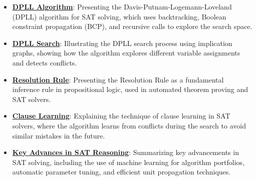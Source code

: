 \documentclass{article}%
\begin{document}
\begin{itemize}[leftmargin=*]
\item \href{https://purdue.brightspace.com/d2l/common/assets/pdfjs-d2l-dist/1.0.14-legacy/web/viewer.html?file=\%2Fcontent\%2Fenforced\%2F1095467-wl.202510.CS.24300.001\%2F15L2-SAT.pdf\%3Fou\%3D1095467\&lang=en-us\&container=d2l-fileviewer-rendered-pdf\&fullscreen=d2l-fileviewer-rendered-pdf-dialog\&height=667#page=21}{\textbf{DPLL Algorithm}}: Presenting the Davis-Putnam-Logemann-Loveland (DPLL) algorithm for SAT solving, which uses backtracking, Boolean constraint propagation (BCP), and recursive calls to explore the search space.%
\item \href{https://purdue.brightspace.com/d2l/common/assets/pdfjs-d2l-dist/1.0.14-legacy/web/viewer.html?file=\%2Fcontent\%2Fenforced\%2F1095467-wl.202510.CS.24300.001\%2F15L2-SAT.pdf\%3Fou\%3D1095467\&lang=en-us\&container=d2l-fileviewer-rendered-pdf\&fullscreen=d2l-fileviewer-rendered-pdf-dialog\&height=667#page=22}{\textbf{DPLL Search}}: Illustrating the DPLL search process using implication graphs, showing how the algorithm explores different variable assignments and detects conflicts.%
\item \href{https://purdue.brightspace.com/d2l/common/assets/pdfjs-d2l-dist/1.0.14-legacy/web/viewer.html?file=\%2Fcontent\%2Fenforced\%2F1095467-wl.202510.CS.24300.001\%2F15L2-SAT.pdf\%3Fou\%3D1095467\&lang=en-us\&container=d2l-fileviewer-rendered-pdf\&fullscreen=d2l-fileviewer-rendered-pdf-dialog\&height=667#page=32}{\textbf{Resolution Rule}}: Presenting the Resolution Rule as a fundamental inference rule in propositional logic, used in automated theorem proving and SAT solvers.%
\item \href{https://purdue.brightspace.com/d2l/common/assets/pdfjs-d2l-dist/1.0.14-legacy/web/viewer.html?file=\%2Fcontent\%2Fenforced\%2F1095467-wl.202510.CS.24300.001\%2F15L2-SAT.pdf\%3Fou\%3D1095467\&lang=en-us\&container=d2l-fileviewer-rendered-pdf\&fullscreen=d2l-fileviewer-rendered-pdf-dialog\&height=667#page=34}{\textbf{Clause Learning}}: Explaining the technique of clause learning in SAT solvers, where the algorithm learns from conflicts during the search to avoid similar mistakes in the future.%
\item \href{https://purdue.brightspace.com/d2l/common/assets/pdfjs-d2l-dist/1.0.14-legacy/web/viewer.html?file=\%2Fcontent\%2Fenforced\%2F1095467-wl.202510.CS.24300.001\%2F15L2-SAT.pdf\%3Fou\%3D1095467\&lang=en-us\&container=d2l-fileviewer-rendered-pdf\&fullscreen=d2l-fileviewer-rendered-pdf-dialog\&height=667#page=35}{\textbf{Key Advances in SAT Reasoning}}: Summarizing key advancements in SAT solving, including the use of machine learning for algorithm portfolios, automatic parameter tuning, and efficient unit propagation techniques.%

\end{itemize}
\end{document}
